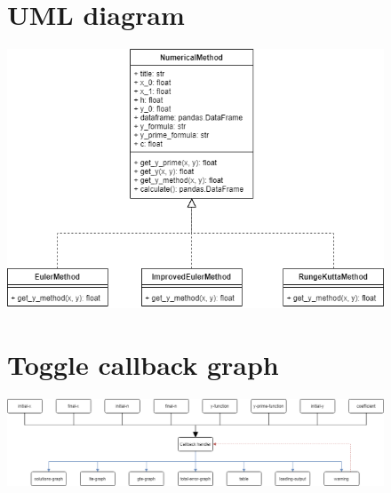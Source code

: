 \documentclass[12pt,letterpaper]{article}
\begin{document}
\begin{figure}[!h]
    \begin{center}
        \section*{UML diagram}
    \end{center}
    \centering
        \includegraphics[width=1\linewidth]{uml.png}
\end{figure}

\begin{figure}[!h]
    \begin{center}
        \section*{Toggle callback graph}
    \end{center}
    \centering
        \includegraphics[width=1\linewidth]{callback.png}
\end{figure}
\end{document}
